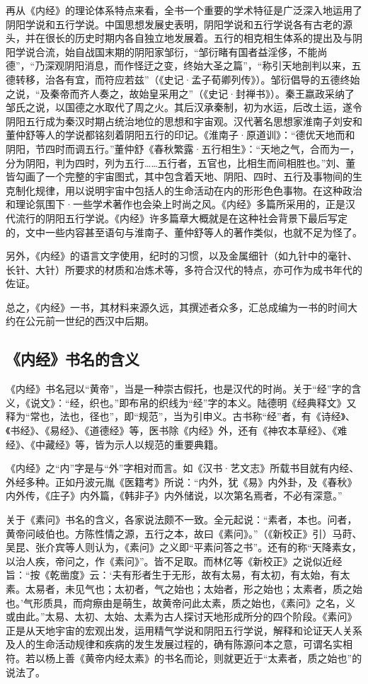 \documentclass[draft,12pt]{ctexbook}
\begin{document}
再从《内经》的理论体系特点来看，全书一个重要的学术特征是广泛深入地运用了阴阳学说和五行学说。中国思想发展史表明，阴阳学说和五行学说各有古老的源头，并在很长的历史时期内各自独立地发展着。五行的相克相生体系的提出及与阴阳学说合流，始自战国末期的阴阳家邹衍，“邹衍睹有国者益淫侈，不能尚德”，“乃深观阴阳消息，而作怪迂之变，终始大圣之篇”，“称引天地剖判以来，五德转移，治各有宜，而符应若兹”（《史记·孟子荀卿列传》）。邹衍倡导的五德终始之说，“及秦帝而齐人奏之，故始皇采用之”（《史记·封禅书》）。秦王嬴政采纳了邹氏之说，以国德之水取代了周之火。其后汉承秦制，初为水运，后改土运，遂令阴阳五行成为秦汉时期占统治地位的思想和宇宙观。汉代著名思想家淮南子刘安和董仲舒等人的学说都铭刻着阴阳五行的印记。《淮南子·原道训》：“德优天地而和阴阳，节四时而调五行。”董仲舒《春秋繁露·五行相生》：“天地之气，合而为一，分为阴阳，判为四时，列为五行……五行者，五官也，比相生而间相胜也。”刘、董皆勾画了一个完整的宇宙图式，其中包含着天地、阴阳、四时、五行及事物间的生克制化规律，用以说明宇宙中包括人的生命活动在内的形形色色事物。在这种政治和理论氛围下·一些学术著作也会染上时尚之风。《内经》多篇所采用的，正是汉代流行的阴阳五行学说。《内经》许多篇章大概就是在这种社会背景下最后写定的，文中一些内容甚至语句与淮南子、董仲舒等人的著作类似，也就不足为怪了。

另外，《内经》的语言文字使用，纪时的习惯，以及金属细针（如九针中的毫针、长针、大针）所要求的材质和冶炼术等，多符合汉代的特点，亦可作为成书年代的佐证。

总之，《内经》一书，其材料来源久远，其撰述者众多，汇总成编为一书的时间大约在公元前一世纪的西汉中后期。

\subsection{《内经》书名的含义} %

《内经》书名冠以“黄帝”，当是一种崇古假托，也是汉代的时尚。关于“经”字的含义，《说文》：“经，织也。”即布帛的织线为“经”字的本义。陆德明《经典释文》又释为“常也，法也，径也”，即“规范”，当为引申义。古书称“经”者，有《诗经》、《书经》、《易经》、《道德经》等，医书除《内经》外，还有《神农本草经》、《难经》、《中藏经》等，皆为示人以规范的重要典籍。

《内经》之“内”字是与“外”字相对而言。如《汉书·艺文志》所载书目就有内经、外经多种。正如丹波元胤《医籍考》所说：“内外，犹《易》内外卦，及《春秋》内外传，《庄子》内外篇，《韩非子》内外储说，以次第名焉者，不必有深意。”

关于《素问》书名的含义，各家说法颇不一致。全元起说：“素者，本也。问者，黄帝问岐伯也。方陈性情之源，五行之本，故曰《素问》。”（《新校正》引）马莳、吴昆、张介宾等人则认为，《素问》之义即“平素问答之书”。还有的称“天降素女，以治人疾，帝问之，作《素问》”。皆不足取。而林亿等《新校正》之说似近经旨：“按《乾凿度》云：‘夫有形者生于无形，故有太易，有太初，有太始，有太素。太易者，未见气也；太初者，气之始也；太始者，形之始也；太素者，质之始也。’气形质具，而疴瘵由是萌生，故黄帝问此太素，质之始也，《素问》之名，义或由此。”太易、太初、太始、太素为古人探讨天地形成所分的四个阶段。《素问》正是从天地宇宙的宏观出发，运用精气学说和阴阳五行学说，解释和论证天人关系及人的生命活动规律和疾病的发生发展过程的，确有陈源问本之意，可谓名实相符。若以杨上善《黄帝内经太素》的书名而论，则就更近于“太素者，质之始也”的说法了。
\end{document}
